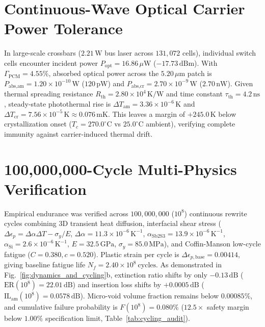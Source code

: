 \documentclass[letterpaper,10pt]{article}
\begin{document}
\section{Continuous-Wave Optical Carrier Power Tolerance}
In large-scale crossbars ($2.21\,\text{W}$ bus laser across $131,072$ cells), individual switch cells encounter incident power $P_{\text{opt}} = 16.86\,\mu\text{W}$ ($-17.73\,\text{dBm}$). With $\Gamma_{\text{PCM}} = 4.55\%$, absorbed optical power across the $5.20\,\mu\text{m}$ patch is $P_{\text{abs,am}} = 1.20 \times 10^{-10}\,\text{W}$ ($120\,\text{pW}$) and $P_{\text{abs,cr}} = 2.70 \times 10^{-9}\,\text{W}$ ($2.70\,\text{nW}$). Given thermal spreading resistance $R_{\text{th}} = 2.80 \times 10^4\,\text{K/W}$ and time constant $\tau_{\text{th}} = 4.2\,\text{ns}$, steady-state photothermal rise is $\Delta T_{\text{am}} = 3.36 \times 10^{-6}\,\text{K}$ and $\Delta T_{\text{cr}} = 7.56 \times 10^{-5}\,\text{K} \approx 0.076\,\text{mK}$. This leaves a margin of $+245.0\,\text{K}$ below crystallization onset ($T_c = 270.0^\circ\text{C}$ vs $25.0^\circ\text{C}$ ambient), verifying complete immunity against carrier-induced thermal drift.

\section{100,000,000-Cycle Multi-Physics Verification}
Empirical endurance was verified across $100,000,000$ ($10^8$) continuous rewrite cycles combining 3D transient heat diffusion, interfacial shear stress ($\Delta\epsilon_p = \Delta\alpha \Delta T - \sigma_y/E$, $\Delta\alpha = 11.3 \times 10^{-6}\,\text{K}^{-1}$, $\alpha_{\text{Sb2S3}} = 13.9 \times 10^{-6}\,\text{K}^{-1}$, $\alpha_{\text{Si}} = 2.6 \times 10^{-6}\,\text{K}^{-1}$, $E = 32.5\,\text{GPa}$, $\sigma_y = 85.0\,\text{MPa}$), and Coffin-Manson low-cycle fatigue \cite{Coffin1954, Manson1953} ($C = 0.380, c = 0.520$). Plastic strain per cycle is $\Delta\epsilon_{p,\text{base}} = 0.00414$, giving baseline fatigue life $N_f = 2.40 \times 10^8\ \text{cycles}$. As demonstrated in Fig.~\ref{fig:dynamics_and_cycling}b, extinction ratio shifts by only $-0.13\,\text{dB}$ ($\text{ER}(10^8) = 22.01\,\text{dB}$) and insertion loss shifts by $+0.0005\,\text{dB}$ ($\text{IL}_{\text{am}}(10^8) = 0.0578\,\text{dB}$). Micro-void volume fraction remains below $0.00085\%$, and cumulative failure probability is $F(10^8) = 0.080\%$ ($12.5\times$ safety margin below $1.00\%$ specification limit, Table~\ref{tab:cycling_audit}).
\end{document}
